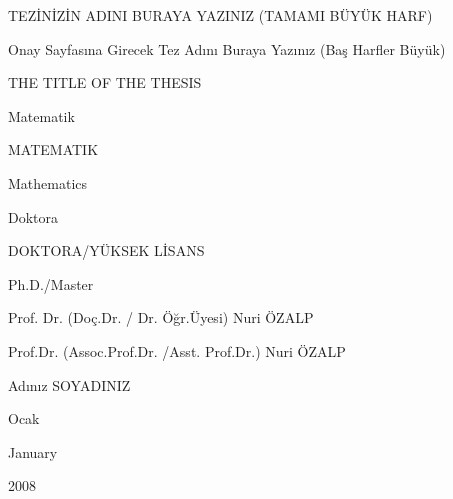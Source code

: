 \documentclass[12pt,a4paper,turkish]{book}
\begin{document}
\begin{tezisim}
TEZİNİZİN ADINI BURAYA YAZINIZ (TAMAMI BÜYÜK HARF)
\end{tezisim}

\begin{tezadonay}
Onay Sayfasına Girecek Tez Adını Buraya Yazınız (Baş Harfler Büyük)
\end{tezadonay}

\begin{thesisname}
THE TITLE OF THE THESIS
\end{thesisname}

\begin{bolumad}
Matematik
\end{bolumad}

\begin{bolumadb}
MATEMATIK
\end{bolumadb}

\begin{department}
Mathematics
\end{department}

\begin{derecead}
Doktora
\end{derecead}

\begin{dereceadb}
DOKTORA/YÜKSEK LİSANS
\end{dereceadb}

\begin{degreename}
Ph.D./Master
\end{degreename}

\begin{danisman}
 Prof. Dr. (Doç.Dr. / Dr. Öğr.Üyesi) Nuri ÖZALP
\end{danisman}

\begin{supervisor}
Prof.Dr. (Assoc.Prof.Dr. /Asst. Prof.Dr.) Nuri ÖZALP
\end{supervisor}

\begin{yazar}
Adınız SOYADINIZ
\end{yazar}

\begin{ay}
Ocak
\end{ay}

\begin{aying}
January
\end{aying}

\begin{yil}
2008
\end{yil}
\end{document}
